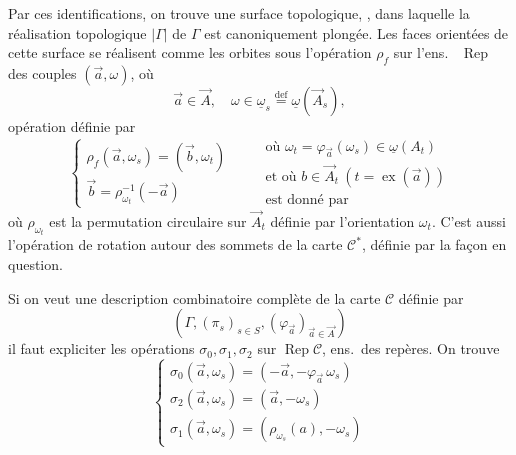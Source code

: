 \documentclass[11pt,a4paper]{article}
\begin{document}
Par ces identifications, on trouve une surface topologique, , dans laquelle la réalisation topologique $|\Gamma|$ de $\Gamma$ est canoniquement plongée. Les faces orientées de cette surface se réalisent comme les orbites sous l'opération $\rho_f$ sur l'ens.\ \struck{\ill{}} $\operatorname{Rep}$ des couples $(\vec{a}, \omega)$, où
\[
\vec{a} \in \vec{A}, \quad \omega \in \underline{\omega}_s \overset{\mathrm{def}}{=} \underline{\omega}(\vec{A}_s),
\]
opération définie par 
\[
\left\lbrace
\begin{array}{l}
\rho_f(\vec{a}, \omega_s) = (\vec{b}, \omega_t) \\
\vec{b} = \rho_{\omega_t}^{-1}(-\vec{a})
\end{array}
\right.
\qquad
\begin{array}{l}
\text{où } \omega_t = \varphi_{\vec{a}}(\omega_s) \in \underline{\omega}(A_t) \\
\text{et où } b \in \vec{A}_t \ (t = \operatorname{ex}(\vec{a})) \\
\text{est donné par}
\end{array}
\]
où $\rho_{\omega_t}$ est la permutation circulaire sur $\vec{A}_t$ définie par l'orientation $\omega_t$. C'est aussi l'opération de rotation autour des sommets de la carte $\mathcal{C}^{*}$, définie par la façon en question.

Si on veut une description combinatoire complète de la carte $\mathcal{C}$ définie par
\[
(\Gamma, (\pi_s)_{s \in S}, (\varphi_{\vec{a}})_{\vec{a} \in \vec{A}})
\]
il faut \struck{\ill{}} expliciter les opérations  $\sigma_0, \sigma_1, \sigma_2$ sur $\operatorname{Rep} \mathcal{C}$, ens.\ des repères. On trouve
\[
\left\lbrace
\begin{array}{l}
\sigma_0(\vec{a}, \omega_s) = (-\vec{a}, -\varphi_{\vec{a}}\,\omega_s) \\
\sigma_2(\vec{a}, \omega_s) = (\vec{a}, -\omega_s) \\
\sigma_1(\vec{a}, \omega_s) = (\rho_{\omega_s}(a), -\omega_s)
\end{array}
\right.
\]
\end{document}
